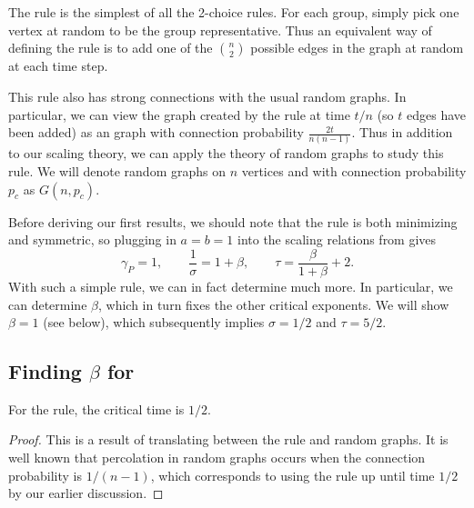 \documentclass[twoside,10pt]{article}
\begin{document}
\section{\ER}

The \ER rule is the simplest of all the 2-choice rules. For each group, simply pick one vertex at random to be the group representative. Thus an equivalent way of defining the \ER rule is to add one of the $\binom{n}{2}$ possible edges in the graph at random at each time step.

This rule also has strong connections with the usual \ER random graphs. In particular, we can view the graph created by the \ER rule at time $t/n$ (so $t$ edges have been added) as an \ER graph with connection probability $\frac{2t}{n(n-1)}$. Thus in addition to our scaling theory, we can apply the theory of \ER random graphs to study this rule. We will denote \ER random graphs on $n$ vertices and with connection probability $p_c$ as $G(n,p_{c})$.

Before deriving our first results, we should note that the \ER rule is both minimizing and symmetric, so plugging in $a=b=1$ into the scaling relations from  gives
\begin{equation}
	\label{ER-crit-exp}
        \gamma_{P} = 1, \qquad \frac{1}{\sigma} = 1 + \beta, \qquad \tau = \frac{\beta}{1+\beta} +2.
\end{equation}
With such a simple rule, we can in fact determine much more. In particular, we can determine $\beta$, which in turn fixes the other critical exponents. We will show $\beta=1$ (see  below), which subsequently implies $\sigma = 1/2$ and $\tau = 5/2$.

\subsection{Finding \texorpdfstring{$\beta$}{beta} for \ER}
\label{finding-beta}

\begin{lem}
	For the \ER rule, the critical time is $1/2$.
\end{lem}
\begin{proof}
	This is a result of translating between the \ER rule and \ER random graphs. It is well known \cite{princeton} that percolation in \ER random graphs occurs when the connection probability is $1/(n-1)$, which corresponds to using the \ER rule up until time $1/2$ by our earlier discussion.
\end{proof}
\end{document}
